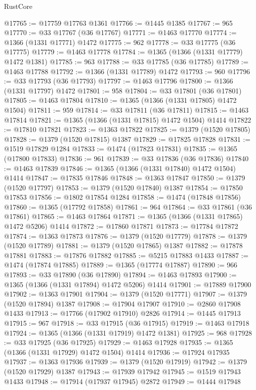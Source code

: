 \begin{lexlean}{RustCore}
\begin{coremodule}
@17765 := @17759 @17763 @1361
@17766 := @1445 @1385
@17767 := 965
@17770 := @33 @17767 (@36 @17767)
@17771 := @1463 @17770
@17774 := @1366 (@1331 @17771) @1472
@17775 := 962
@17778 := @33 @17775 (@36 @17775)
@17779 := @1463 @17778
@17784 := @1365 (@1366 (@1331 @17779) @1472 @1381)
@17785 := 963
@17788 := @33 @17785 (@36 @17785)
@17789 := @1463 @17788
@17792 := @1366 (@1331 @17789) @1472
@17793 := 960
@17796 := @33 @17793 (@36 @17793)
@17797 := @1463 @17796
@17800 := @1366 (@1331 @17797) @1472
@17801 := 958
@17804 := @33 @17801 (@36 @17801)
@17805 := @1463 @17804
@17810 := @1365 (@1366 (@1331 @17805) @1472 @1504)
@17811 := 959
@17814 := @33 @17811 (@36 @17811)
@17815 := @1463 @17814
@17821 := @1365 (@1366 (@1331 @17815) @1472 @1504) @1414
@17822 := @17810 @17821
@17823 := @1363 @17822
@17825 := @1379 (@1520 @17805)
@17828 := @1379 (@1520 @17815) @1387
@17829 := @17825 @17828
@17831 := @1519 @17829 @1284
@17833 := @1474 (@17823 @17831)
@17835 := @1365 (@17800 @17833)
@17836 := 961
@17839 := @33 @17836 (@36 @17836)
@17840 := @1463 @17839
@17846 := @1365 (@1366 (@1331 @17840) @1472 @1504) @1414
@17847 := @17835 @17846
@17848 := @1363 @17847
@17850 := @1379 (@1520 @17797)
@17853 := @1379 (@1520 @17840) @1387
@17854 := @17850 @17853
@17856 := @1802 @17854 @1284
@17858 := @1474 (@17848 @17856)
@17860 := @1365 (@17792 @17858)
@17861 := 964
@17864 := @33 @17861 (@36 @17861)
@17865 := @1463 @17864
@17871 := @1365 (@1366 (@1331 @17865) @1472 @5206) @1414
@17872 := @17860 @17871
@17873 := @17784 @17872
@17874 := @1363 @17873
@17876 := @1379 (@1520 @17779)
@17878 := @1379 (@1520 @17789)
@17881 := @1379 (@1520 @17865) @1387
@17882 := @17878 @17881
@17883 := @17876 @17882
@17885 := @5215 @17883 @1433
@17887 := @1474 (@17874 @17885)
@17889 := @1365 (@17774 @17887)
@17890 := 966
@17893 := @33 @17890 (@36 @17890)
@17894 := @1463 @17893
@17900 := @1365 (@1366 (@1331 @17894) @1472 @5206) @1414
@17901 := @17889 @17900
@17902 := @1363 @17901
@17904 := @1379 (@1520 @17771)
@17907 := @1379 (@1520 @17894) @1387
@17908 := @17904 @17907
@17910 := @2860 @17908 @1433
@17913 := @17766 (@17902 @17910) @2826
@17914 := @1445 @17913
@17915 := 967
@17918 := @33 @17915 (@36 @17915)
@17919 := @1463 @17918
@17924 := @1365 (@1366 (@1331 @17919) @1472 @1381)
@17925 := 968
@17928 := @33 @17925 (@36 @17925)
@17929 := @1463 @17928
@17935 := @1365 (@1366 (@1331 @17929) @1472 @1504) @1414
@17936 := @17924 @17935
@17937 := @1363 @17936
@17939 := @1379 (@1520 @17919)
@17942 := @1379 (@1520 @17929) @1387
@17943 := @17939 @17942
@17945 := @1519 @17943 @1433
@17948 := @17914 (@17937 @17945) @2872
@17949 := @1444 @17948

\end{coremodule}
\end{lexlean}
